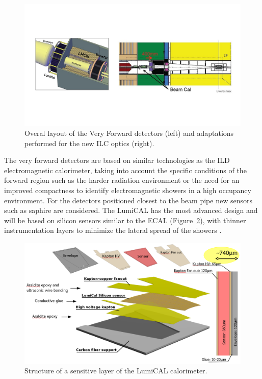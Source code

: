 \begin{figure}[t!]
\centering
\includegraphics[width=1.0\hsize]{Detector/fig/VFS.jpg}
\caption{Overal layout of the Very Forward detectors (left) and adaptations performed for the new ILC optics (right).}
\label{fig:det:VFS}
\end{figure}

The very forward detectors are based on similar technologies as the ILD electromagnetic calorimeter, taking into account the specific conditions of the forward region such as the harder radiation environment or the need for an improved compactness to identify electromagnetic showers in a high occupancy environment. For the detectors positioned closest to the beam pipe new sensors such as saphire are considered. The LumiCAL has the most advanced design and will be based on silicon sensors similar to the ECAL (Figure~\ref{fig:det:lumical}), with thinner instrumentation layers to minimize the lateral spread of the showers .     

\begin{figure}[t!]
\centering
\includegraphics[width=0.8\hsize]{Detector/fig/lumical_layer.png}
\caption{Structure of a sensitive layer of the LumiCAL calorimeter.}
\label{fig:det:lumical}
\end{figure}

